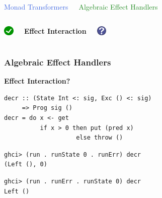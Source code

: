 \documentclass[xcolor=pdftex,dvipsnames,table]{beamer}
\def\checkmark{\includegraphics[height=0.5cm]{checkmark.png}}
\def\questionmark{\includegraphics[height=0.5cm]{question_mark.png}}
\begin{document}
\begin{frame}
  \begin{columns}[c]
    \begin{center}
      \Large{\textcolor{RoyalBlue}{Monad Transformers}}
    \end{center}
    \begin{center}
      \Large{\textcolor{ForestGreen}{Algebraic Effect Handlers}}
    \end{center}
  \end{columns}
  \bigskip
  \bigskip
  \begin{columns}[c]
    \begin{center}
      \checkmark
    \end{center}
    \begin{center}
      \textbf{Effect Interaction}
    \end{center}
    \begin{center}
      \questionmark
    \end{center}
  \end{columns}
\end{frame}

{
\begin{frame}[fragile, t]
  \frametitle{Algebraic Effect Handlers}
  \begin{center}
    \textbf{\Large{Effect Interaction?}}
  \end{center}
  \begin{verbatim}
decr :: (State Int <: sig, Exc () <: sig)
     => Prog sig ()
decr = do x <- get
          if x > 0 then put (pred x)
                    else throw ()
  \end{verbatim}
  \pause
  \begin{verbatim}
ghci> (run . runState 0 . runErr) decr
(Left (), 0)
  \end{verbatim}
  \pause
  \begin{verbatim}
ghci> (run . runErr . runState 0) decr
Left ()
  \end{verbatim}
\end{frame}
}
\end{document}
